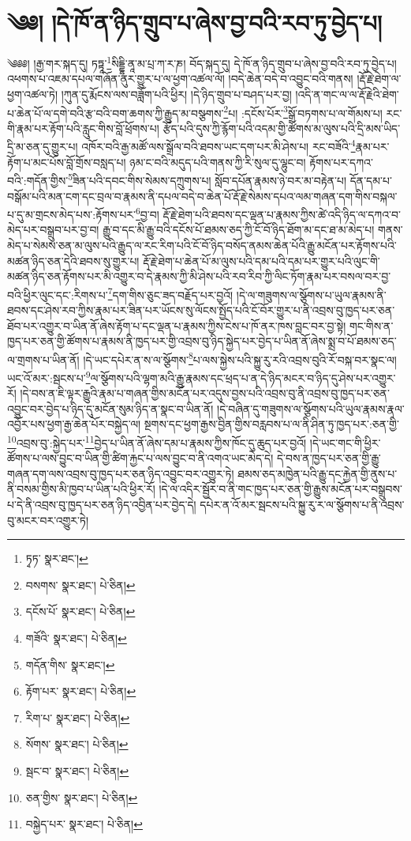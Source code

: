 \setcounter{footnote}{0} 
\chapter{༄༅། །དེ་ཁོ་ན་ཉིད་གྲུབ་པ་ཞེས་བྱ་བའི་རབ་ཏུ་བྱེད་པ།}༄༅༅། །རྒྱ་གར་སྐད་དུ། ཏཏྟཱ་\footnote{ཏྭཏ་  སྣར་ཐང་། }སིདྡྷི་ནཱ་མ་པྲ་ཀ་ར་ཎ། བོད་སྐད་དུ། དེ་ཁོ་ན་ཉིད་གྲུབ་པ་ཞེས་བྱ་བའི་རབ་ཏུ་བྱེད་པ། འཕགས་པ་འཇམ་དཔལ་གཞོན་ནུར་གྱུར་པ་ལ་ཕྱག་འཚལ་ལོ། །བདེ་ཆེན་བདེ་བ་འབྱུང་བའི་གནས། །རྡོ་རྗེ་ཐེག་ལ་ཕྱག་འཚལ་ཏེ། །ཀུན་དུ་རྨོངས་ལས་བཟློག་པའི་ཕྱིར། །དེ་ཉིད་གྲུབ་པ་བཤད་པར་བྱ། །འདི་ན་གང་ལ་ལ་རྡོ་རྗེའི་ཐེག་པ་ཆེན་པོ་ལ་དགེ་བའི་རྩ་བའི་བག་ཆགས་ཀྱི་རྒྱུད་མ་བསྩགས་\footnote{བསགས་  སྣར་ཐང་།  པེ་ཅིན། }པ། :དངོས་པོར་\footnote{དངོས་པོ་  སྣར་ཐང་།  པེ་ཅིན། }སྒྲོ་བཏགས་པ་ལ་གོམས་པ། རང་གི་རྣམ་པར་རྟོག་པའི་རླུང་གིས་བློ་ཕྲོགས་པ། རྩོད་པའི་དུས་ཀྱི་རྙོག་པའི་འདམ་གྱི་ཚོགས་མ་ལུས་པའི་དྲི་མས་ཡིད་དྲི་མ་ཅན་དུ་གྱུར་པ། འཁོར་བའི་རྒྱ་མཚོ་ལས་སྒྲོལ་བའི་ཐབས་ཡང་དག་པར་མི་ཤེས་པ། རང་བཟོའི་\footnote{གཟོའི་  སྣར་ཐང་།  པེ་ཅིན། }རྣམ་པར་རྟོག་པ་མང་པོས་བློ་གྲོས་བསླད་པ། ཉམ་ང་བའི་མདུད་པའི་གནས་ཀྱི་རི་སུལ་དུ་ལྷུང་བ། རྟོགས་པར་དཀའ་བའི་:གདོན་གྱིས་\footnote{གདོན་གིས་  སྣར་ཐང་། }ཟིན་པའི་དབང་གིས་སེམས་དཀྲུགས་པ། སློབ་དཔོན་རྣམས་ཉེ་བར་མ་བརྟེན་པ། དོན་དམ་པ་བསྒོམ་པའི་མན་ངག་དང་བྲལ་བ་རྣམས་ནི་དཔལ་བདེ་བ་ཆེན་པོ་རྡོ་རྗེ་སེམས་དཔའ་ལམ་གཞན་དག་གིས་བསྐལ་པ་དུ་མ་གྲངས་མེད་པས་:རྟོགས་པར་\footnote{རྟོག་པར་  སྣར་ཐང་།  པེ་ཅིན། }བྱ་བ། རྡོ་རྗེ་ཐེག་པའི་ཐབས་དང་ལྡན་པ་རྣམས་ཀྱིས་ཚེ་འདི་ཉིད་ལ་དཀའ་བ་མེད་པར་བསྒྲུབ་པར་བྱ་བ། རྒྱུ་བ་དང་མི་རྒྱུ་བའི་དངོས་པོ་ཐམས་ཅད་ཀྱི་ངོ་བོ་ཉིད་ཐོག་མ་དང་ཐ་མ་མེད་པ། གནས་མེད་པ་སེམས་ཅན་མ་ལུས་པའི་རྒྱུད་ལ་རང་རིག་པའི་ངོ་བོ་ཉིད་བསོད་ནམས་ཆེན་པོའི་རྒྱུ་མངོན་པར་རྟོགས་པའི་མཚན་ཉིད་ཅན་དེའི་ཐབས་སུ་གྱུར་པ། རྡོ་རྗེ་ཐེག་པ་ཆེན་པོ་མ་ལུས་པའི་དམ་པའི་དམ་པར་གྱུར་པའི་ལུང་གི་མཚན་ཉིད་ཅན་རྟོགས་པར་མི་འགྱུར་བ་དེ་རྣམས་ཀྱི་མི་ཤེས་པའི་རབ་རིབ་ཀྱི་ལིང་ཏོག་རྣམ་པར་བསལ་བར་བྱ་བའི་ཕྱིར་ལུང་དང་:རིགས་པ་\footnote{རིག་པ་  སྣར་ཐང་།  པེ་ཅིན། }དག་གིས་ཅུང་ཟད་བརྗོད་པར་བྱའོ། །དེ་ལ་གཟུགས་ལ་སྩོགས་པ་ཡུལ་རྣམས་ནི་ཐབས་དང་ཤེས་རབ་ཀྱིས་རྣམ་པར་ཟིན་པར་ཡོངས་སུ་ལོངས་སྤྱོད་པའི་ངོ་བོར་གྱུར་པ་ནི་འབྲས་བུ་ཁྱད་པར་ཅན་ཐོབ་པར་འགྱུར་བ་ཡིན་ནོ་ཞེས་རྟོག་པ་དང་ལྡན་པ་རྣམས་ཀྱིས་ངེས་པ་ཁོ་ནར་ཁས་བླང་བར་བྱ་སྟེ། གང་གིས་ན་ཁྱད་པར་ཅན་གྱི་ཚོགས་པ་རྣམས་ནི་ཁྱད་པར་གྱི་འབྲས་བུ་ཉིད་སྐྱེད་པར་བྱེད་པ་ཡིན་ནོ་ཞེས་སྨྲ་བ་པོ་ཐམས་ཅད་ལ་གྲགས་པ་ཡིན་ནོ། །དེ་ཡང་དཔེར་ན་ས་ལ་སྩོགས་\footnote{སོགས་  སྣར་ཐང་།  པེ་ཅིན། }པ་ལས་སྐྱེས་པའི་སྐྱུ་རུ་རའི་འབྲས་བུའི་རོ་བསྐ་བར་སྣང་ལ། ཡང་འོ་མར་:སྦངས་པ་\footnote{སྦང་བ་  སྣར་ཐང་།  པེ་ཅིན། }ལ་སྩོགས་པའི་ལྷག་མའི་རྒྱུ་རྣམས་དང་ཕྲད་པ་ན་དེ་ཉིད་མངར་བ་ཉིད་དུ་ཤེས་པར་འགྱུར་རོ། །དེ་བས་ན་ཇི་ལྟར་རྒྱུའི་རྣམ་པ་གཞན་གྱིས་མངོན་པར་འདུས་བྱས་པའི་འབྲས་བུ་ནི་འབྲས་བུ་ཁྱད་པར་ཅན་འབྱུང་བར་བྱེད་པ་ཉིད་དུ་མངོན་སུམ་ཉིད་ན་སྣང་བ་ཡིན་ནོ། །དེ་བཞིན་དུ་གཟུགས་ལ་སྩོགས་པའི་ཡུལ་རྣམས་རྣལ་འབྱོར་པས་ཕྱག་རྒྱ་ཆེན་པོར་བསྐྱེད་ལ། སྔགས་དང་ཕྱག་རྒྱས་བྱིན་གྱིས་བརླབས་པ་ལ་ནི་ཤིན་ཏུ་ཁྱད་པར་:ཅན་གྱི་\footnote{ཅན་གྱིས་  སྣར་ཐང་།  པེ་ཅིན། }འབྲས་བུ་:སྐྱེད་པར་\footnote{བསྐྱེད་པར་  སྣར་ཐང་།  པེ་ཅིན། }བྱེད་པ་ཡིན་ནོ་ཞེས་དམ་པ་རྣམས་ཀྱིས་ཁོང་དུ་ཆུད་པར་བྱའོ། །དེ་ཡང་གང་གི་ཕྱིར་ཚོགས་པ་ལས་བྱུང་བ་ཡིན་གྱི་ཚིག་རྐྱང་པ་ལས་བྱུང་བ་ནི་འགའ་ཡང་མེད་དེ། དེ་བས་ན་ཁྱད་པར་ཅན་གྱི་རྒྱུ་གཞན་དག་ལས་འབྲས་བུ་ཁྱད་པར་ཅན་ཉིད་འབྱུང་བར་འགྱུར་ཏེ། ཐམས་ཅད་མཁྱེན་པའི་རྒྱུ་དང་རྐྱེན་གྱི་ནུས་པ་ནི་བསམ་གྱིས་མི་ཁྱབ་པ་ཡིན་པའི་ཕྱིར་རོ། །དེ་ལ་འདིར་སྦྱོར་བ་ནི་གང་ཁྱད་པར་ཅན་གྱི་རྒྱུས་མངོན་པར་བསྒྲུབས་པ་དེ་ནི་འབྲས་བུ་ཁྱད་པར་ཅན་ཉིད་འབྱིན་པར་བྱེད་དེ། དཔེར་ན་འོ་མར་སྦངས་པའི་སྐྱུ་རུ་ར་ལ་སྩོགས་པ་ནི་འབྲས་བུ་མངར་བར་འགྱུར་ཏེ། 
